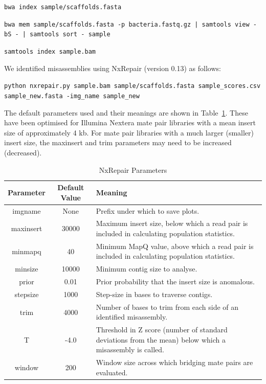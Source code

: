 \documentclass[fleqn,10pt]{wlpeerj}
\begin{document}
\texttt{bwa index sample/scaffolds.fasta}

\texttt{bwa mem sample/scaffolds.fasta -p bacteria.fastq.gz | samtools view -bS - |  samtools sort - sample}

\texttt{samtools index sample.bam}

We identified misassemblies using NxRepair (version 0.13) as follows:

\texttt{python nxrepair.py sample.bam   sample/scaffolds.fasta sample\_scores.csv  sample\_new.fasta -img\_name sample\_new}


The default parameters used and their meanings are shown in Table~\ref{tab:parameters}. These have been optimised for Illumina Nextera mate pair libraries with a mean insert size of approximately 4 kb. For mate pair libraries with a much larger (smaller) insert size, the maxinsert and trim parameters may need to be increased (decreased).

\begin{table}
\begin{center}
\begin{tabular}{|c|c|p{8cm}|}
    \hline
    Parameter & Default Value & Meaning \\ \hline
    imgname & None & Prefix under which to save plots. \\
    maxinsert & 30000 &  Maximum insert size, below which a read pair is included in calculating population statistics.\\
    minmapq & 40 & Minimum MapQ value, above which a read pair is included in calculating population statistics.\\
    minsize & 10000 & Minimum contig size to analyse.\\ 
    prior & 0.01 & Prior probability that the insert size is anomalous.\\
    stepsize & 1000 & Step-size in bases to traverse contigs.\\
    trim & 4000 & Number of bases to trim from each side of an identified misassembly.\\
    T & -4.0 & Threshold in Z score (number of standard deviations from the mean) below which a misassembly is called.\\
    window & 200 & Window size across which bridging mate pairs are evaluated.\\ \hline
\end{tabular}
\end{center}
\caption{NxRepair Parameters \label{tab:parameters}}
\end{table}
\end{document}
